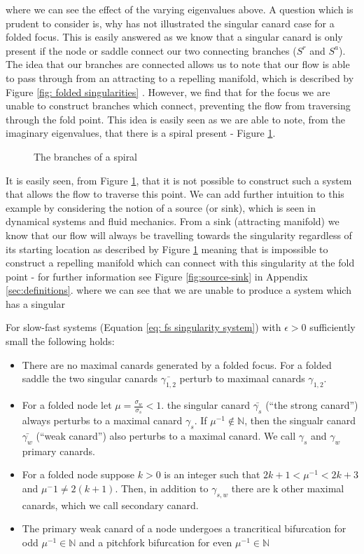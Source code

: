 where we can see the effect of the varying eigenvalues above. A question which is prudent to consider is, why has not \citep{MMO} illustrated the singular canard case for a folded focus. This is easily answered as we know that a singular canard is only present if the node or saddle connect our two connecting branches ($ S^r $ and $ S^a $). The idea that our branches are connected allows us to note that our flow is able to pass through from an attracting to a repelling manifold, which is described by Figure \ref{fig: folded singularities} \citep{CanardsinR3}. However, we find that for the focus we are unable to construct branches which connect, preventing the flow from traversing through the fold point. This idea is easily seen as we are able to note, from the imaginary eigenvalues, that there is a spiral present - Figure \ref{fig: spiral}.
\begin{figure}[h!]\centering
	\caption{The branches of a spiral}
	\label{fig: spiral}
\end{figure}\newpage
It is easily seen, from Figure \ref{fig: spiral}, that it is not possible to construct such a system that allows the flow to traverse this point. We can add further intuition to this example by considering the notion of a source (or sink), which is seen in dynamical systems and fluid mechanics. From a sink (attracting manifold) we know that our flow will always be travelling towards the singularity regardless of its starting location as described by Figure \ref{fig: spiral} meaning that is impossible to construct a repelling manifold which can connect with this singularity at the fold point - for further information see Figure \ref{fig:source-sink} in Appendix \ref{sec:definitions}. 
where we can see that we are unable to produce a system which has a singular 
\begin{theorem}\label{thm: canards in R3}
	For slow-fast systems (Equation \ref{eq: fs singularity system}) with $ \epsilon>0 $ sufficiently small the following holds:\begin{itemize} 
		\item  There are no maximal canards generated by a folded focus. For a folded saddle the two singular canards $ \bar{\gamma_{1,2}} $ perturb to maximaal canards $ \gamma_{1,2} $.
		\item  For a folded node let $\mu=\frac{\sigma_w}{\sigma_s} <1$. the singular canard $ \bar{\gamma_{s}} $ (``the strong canard'') always perturbs to a maximal canard $ \gamma_{s} $. If $ \mu^{-1}\not \in \mathbb{N} $, then the singualr canard $ \bar{\gamma_{w}} $ (``weak canard'') also perturbs to a maximal canard. We call $ \gamma_{s} $ and $ \gamma_{w} $ primary canards.
		\item For a folded node suppose $ k>0 $ is an integer such that $ 2k+1<\mu^{-1} <2k+3$ and $ \mu^-1\neq 2(k+1) $. Then, in addition to $ \gamma_{s,w} $ there are k other maximal canards, which we call secondary canard.
		\item The primary weak canard of a node undergoes a trancritical bifurcation for odd $ \mu^{-1}\in\mathbb{N} $ and a pitchfork bifurcation for even $ \mu^{-1}\in\mathbb{N} $
	\end{itemize}
	\end{theorem}
